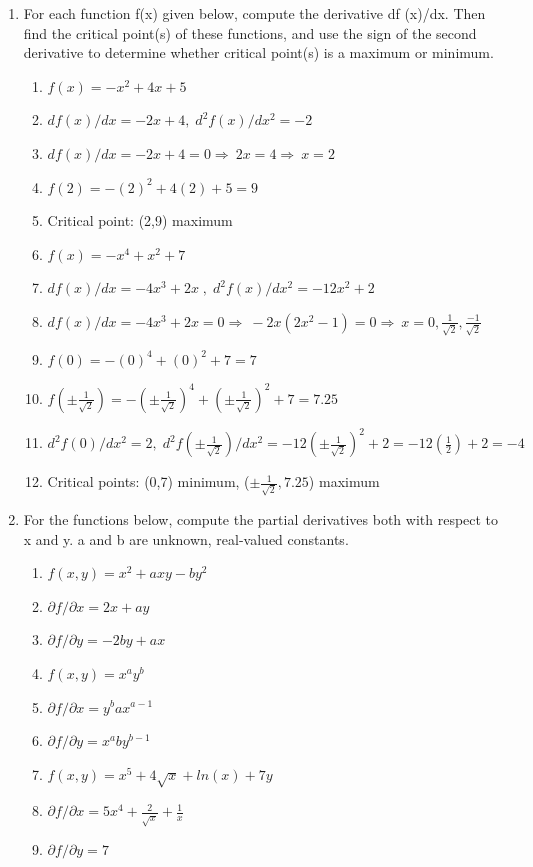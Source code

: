\documentclass{article}
\begin{document}
\begin{enumerate}
\item For each function f(x) given below, compute the derivative df (x)/dx. Then find the critical point(s) of these functions, and use the sign of the second derivative to determine whether critical point(s) is a maximum or minimum.
\begin{enumerate}[label=(\alph*)]
\item $f(x) = -x^2 + 4x + 5$
\item[] $df(x)/dx=-2x+4,\;d^2f(x)/dx^2=-2$
\item[] $df(x)/dx=-2x+4=0 \Rightarrow\ 2x=4 \Rightarrow\ x=2$
\item[] $f(2)=-(2)^2+4(2)+5=9$
\item[] Critical point: (2,9) maximum
\item $f(x) = -x^4 + x^2 + 7$
\item[] $df(x)/dx=-4x^3+2x\;,\;d^2f(x)/dx^2=-12x^2+2$
\item[] $df(x)/dx=-4x^3+2x=0 \Rightarrow\ -2x(2x^2-1)=0 \Rightarrow\ x=0,\frac{1}{\sqrt{2}},\frac{-1}{\sqrt{2}}$
\item[] $f(0)=-(0)^4+(0)^2+7=7$ 
\item[] $f(\pm\frac{1}{\sqrt{2}})=-(\pm\frac{1}{\sqrt{2}})^4+(\pm\frac{1}{\sqrt{2}})^2+7=7.25$
\item[] $d^2f(0)/dx^2=2,\;d^2f(\pm\frac{1}{\sqrt{2}})/dx^2=-12(\pm\frac{1}{\sqrt{2}})^2+2=-12(\frac{1}{2})+2=-4$
\item[] Critical points: (0,7) minimum, ($\pm\frac{1}{\sqrt{2}},7.25$) maximum
\end{enumerate}
\item For the functions below, compute the partial derivatives both with respect to x and y. a and b are unknown, real-valued constants.
\begin{enumerate}[label=(\alph*)]
\item $f(x, y) = x^2 + axy -by^2$
\item[] $\partial f/\partial x=2x+ay$
\item[] $\partial f/\partial y=-2by+ax$
\item $f(x, y) = x^ay^b$
\item[] $\partial f/\partial x=y^bax^{a-1}$
\item[] $\partial f/\partial y=x^aby^{b-1}$
\item $f(x, y) =x^5+4\sqrt x+ln(x)+7y$
\item[] $\partial f/\partial x=5x^4 + \frac{2}{\sqrt{x}}+\frac{1}{x}$
\item[] $\partial f/\partial y=7$

\end{enumerate}
\end{enumerate}
\end{document}
